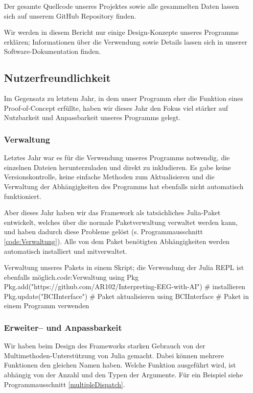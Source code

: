 \documentclass[10pt]{article}
\newcommand{\coderef}[1]{Programmausschnitt \ref{#1}}
\begin{document}
Der gesamte Quellcode unseres Projektes sowie alle gesammelten Daten lassen sich auf unserem GitHub Repository \cite{InterpretingEEG} finden.

Wir werden in diesem Bericht nur einige Design-Konzepte unseres Programms erklären; Informationen über die Verwendung sowie Details lassen sich in unserer Software-Dokumentation \cite{BCIInterfaceDocs} finden. 

\subsection{Nutzerfreundlichkeit}

Im Gegensatz zu letztem Jahr, in dem unser Programm eher die Funktion eines Proof-of-Concept erfüllte, haben wir dieses Jahr den Fokus viel stärker auf Nutzbarkeit und Anpassbarkeit unseres Programms gelegt.

\subsubsection{Verwaltung}

Letztes Jahr war es für die Verwendung unseres Programms notwendig, die einzelnen Dateien herunterzuladen und direkt zu inkludieren.
Es gabe keine Versionskontrolle, keine einfache Methoden zum Aktualisieren und die Verwaltung der Abhängigkeiten des Programms hat ebenfalls nicht automatisch funktioniert.

Aber dieses Jahr haben wir das Framework als tatsächliches Julia-Paket entwickelt, welches über die normale Paketverwaltung verwaltet werden kann, und haben dadurch diese Probleme gelöst (s. \coderef{code:Verwaltung}).
Alle von dem Paket benötigten Abhängigkeiten werden automatisch installiert und mitverwaltet.

\begin{code}[0.9]{Verwaltung unseres Pakets in einem Skript; die Verwendung der Julia REPL ist ebenfalls möglich.}{code:Verwaltung}
    using Pkg
    Pkg.add("https://github.com/AR102/Interpreting-EEG-with-AI") # installieren
    Pkg.update("BCIInterface") # Paket aktualisieren
    using BCIInterface # Paket in einem Programm verwenden
\end{code}

\subsubsection{Erweiter-- und Anpassbarkeit}

Wir haben beim Design des Frameworks starken Gebrauch von der Multimethoden-Unterstützung von Julia gemacht.
Dabei können mehrere Funktionen den gleichen Namen haben. Welche Funktion ausgeführt wird, ist abhängig von der Anzahl und den Typen der Argumente. Für ein Beispiel siehe \coderef{multipleDispatch}.
\end{document}
